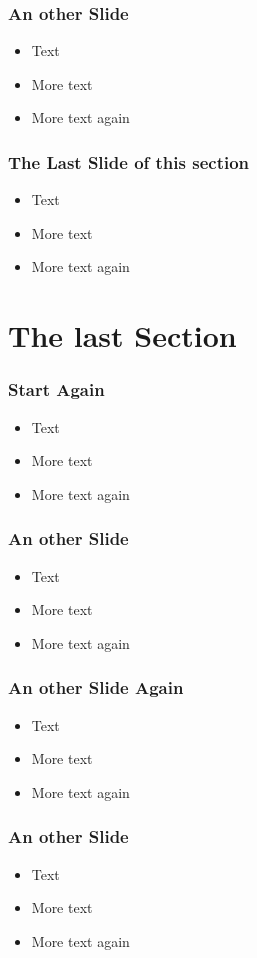 \begin{frame} 
\frametitle{An other Slide}
\begin{itemize}[<+->]
 \item Text
 \item More text
 \item More text again
\end{itemize}
\end{frame}

\begin{frame} 
\frametitle{The Last Slide of this section}
\begin{itemize}[<+->]
 \item Text
 \item More text
 \item More text again
\end{itemize}
\end{frame}

\section{The last Section}
\begin{frame} 
\frametitle{Start Again}
\begin{itemize}[<+->]
 \item Text
 \item More text
 \item More text again
\end{itemize}
\end{frame}

\begin{frame} 
\frametitle{An other Slide}
\begin{itemize}[<+->]
 \item Text
 \item More text
 \item More text again
\end{itemize}
\end{frame}

\begin{frame} 
\frametitle{An other Slide Again}
\begin{itemize}[<+->]
 \item Text
 \item More text
 \item More text again
\end{itemize}
\end{frame}

\begin{frame} 
\frametitle{An other Slide}
\begin{itemize}[<+->]
 \item Text
 \item More text
 \item More text again
\end{itemize}
\end{frame}

